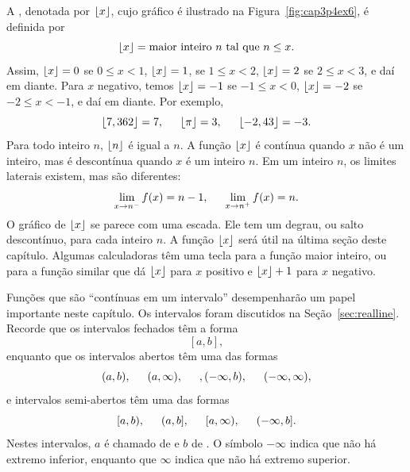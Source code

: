 \begin{example}\label{ex:floorfunc}
  A %
  , denotada por
  $\left\lfloor x\right\rfloor$, cujo gráfico é ilustrado na Figura~\ref{fig:cap3p4ex6},
  é definida por
  $$
    \left\lfloor x\right\rfloor = \text{maior inteiro } n \text{ tal que } n \le x.
  $$
  Assim, $\left\lfloor x\right\rfloor = 0$ se $0 \le x < 1$, $\left\lfloor x\right\rfloor = 1$,
  se $1 \le x < 2$, $\left\lfloor x\right\rfloor = 2$ se $2 \le x < 3$, e daí em diante.
  Para $x$ negativo, temos $\left\lfloor x\right\rfloor = -1$ se $-1 \le x < 0$,
  $\left\lfloor x\right\rfloor = -2$ se $-2 \le x < -1$, e daí em diante. Por exemplo,
  $$
    \left\lfloor7,362\right\rfloor = 7, \hspace{1.5em}
    \left\lfloor\pi\right\rfloor = 3, \hspace{1.5em}
    \left\lfloor-2,43\right\rfloor = -3.
  $$
  Para todo inteiro $n$, $\left\lfloor n\right\rfloor$ é igual a $n$. A função $\left\lfloor x\right\rfloor$
  é contínua quando $x$ não é um inteiro, mas é descontínua quando $x$ é
  um inteiro $n$. Em um inteiro $n$, os limites laterais existem, mas são
  diferentes:
  $$
    \lim_{x \to n^-} f(x) = n-1, \hspace{1.5em}
    \lim_{x \to n^+} f(x) = n.
  $$
  O gráfico de $\left\lfloor x\right\rfloor$ se parece com uma escada. Ele tem um degrau,
  ou salto descontínuo, para cada inteiro $n$. A função $\left\lfloor x\right\rfloor$ será
  útil na última seção deste capítulo. Algumas calculadoras têm uma tecla
  para a função maior inteiro, ou para a função similar que dá $\left\lfloor x\right\rfloor$
  para $x$ positivo e $\left\lfloor x\right\rfloor + 1$ para $x$ negativo.
\end{example}

Funções que são ``contínuas em um intervalo'' desempenharão um papel
importante neste capítulo. Os intervalos foram discutidos na
Seção~\ref{sec:realline}. Recorde que os intervalos fechados têm a forma
$$
  [a, b],
$$
enquanto que os intervalos abertos têm uma das formas
$$
  (a, b), \hspace{1.5em} (a, \infty), \hspace{1.5em}, (-\infty, b),
  \hspace{1.5em} (-\infty, \infty),
$$
e intervalos semi-abertos têm uma das formas
$$
  [a, b), \hspace{1.5em} (a, b], \hspace{1.5em} [a, \infty),
  \hspace{1.5em} (-\infty, b].
$$
Nestes intervalos, $a$ é chamado de  e $b$ de
. O símbolo $-\infty$ indica que não há extremo
inferior, enquanto que $\infty$ indica que não há extremo superior.

